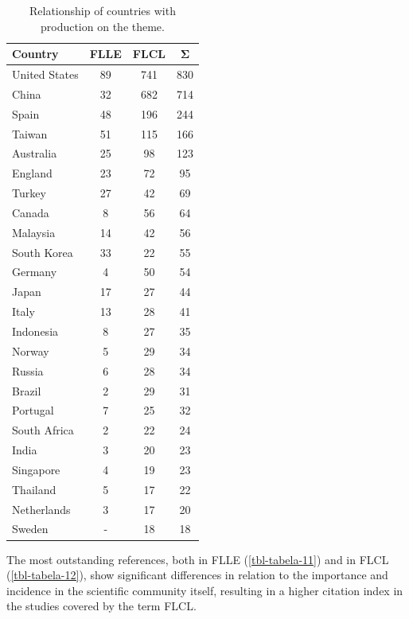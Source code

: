 \documentclass{textolivre}
\begin{document}
\begin{table}[htpb]
\caption{Relationship of countries with production on the theme.}
\label{tbl-tabela-10}
\centering
\begin{tabular}{lccc}
\toprule
\textbf{Country} & \textbf{FLLE} & \textbf{FLCL} & \textbf{Σ} \\
\midrule
United States & 89 & 741 & 830 \\ 
China         & 32 & 682 & 714 \\ 
Spain         & 48 & 196 & 244 \\ 
Taiwan        & 51 & 115 & 166 \\ 
Australia     & 25 & 98  & 123 \\ 
England       & 23 & 72  & 95  \\ 
Turkey        & 27 & 42  & 69  \\ 
Canada        & 8  & 56  & 64  \\ 
Malaysia      & 14 & 42  & 56  \\ 
South Korea   & 33 & 22  & 55  \\ 
Germany       & 4  & 50  & 54  \\ 
Japan         & 17 & 27  & 44  \\ 
Italy         & 13 & 28  & 41  \\ 
Indonesia     & 8  & 27  & 35  \\ 
Norway        & 5  & 29  & 34  \\ 
Russia        & 6  & 28  & 34  \\ 
Brazil        & 2  & 29  & 31  \\ 
Portugal      & 7  & 25  & 32  \\ 
South Africa  & 2  & 22  & 24  \\ 
India         & 3  & 20  & 23  \\ 
Singapore     & 4  & 19  & 23  \\ 
Thailand      & 5  & 17  & 22  \\ 
Netherlands   & 3  & 17  & 20  \\ 
Sweden        & -  & 18  & 18  \\ 
\bottomrule
\end{tabular}
\end{table}

The most outstanding references, both in FLLE (\cref{tbl-tabela-11}) and in FLCL (\cref{tbl-tabela-12}), show significant differences in relation to the importance and incidence in the scientific community itself, resulting in a higher citation index in the studies covered by the term FLCL.
\end{document}
